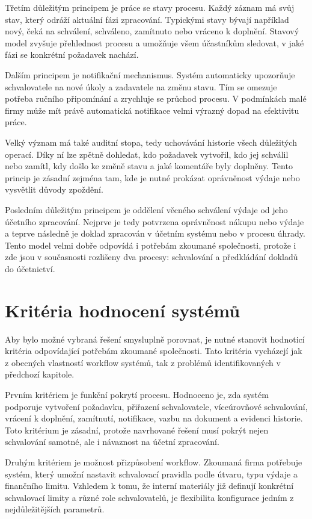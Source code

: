 Třetím důležitým principem je práce se stavy procesu. Každý záznam má svůj stav, který odráží aktuální fázi zpracování. Typickými stavy bývají například nový, čeká na schválení, schváleno, zamítnuto nebo vráceno k doplnění. Stavový model zvyšuje přehlednost procesu a umožňuje všem účastníkům sledovat, v jaké fázi se konkrétní požadavek nachází.

Dalším principem je notifikační mechanismus. Systém automaticky upozorňuje schvalovatele na nové úkoly a zadavatele na změnu stavu. Tím se omezuje potřeba ručního připomínání a zrychluje se průchod procesu. V podmínkách malé firmy může mít právě automatická notifikace velmi výrazný dopad na efektivitu práce.

Velký význam má také auditní stopa, tedy uchovávání historie všech důležitých operací. Díky ní lze zpětně dohledat, kdo požadavek vytvořil, kdo jej schválil nebo zamítl, kdy došlo ke změně stavu a jaké komentáře byly doplněny. Tento princip je zásadní zejména tam, kde je nutné prokázat oprávněnost výdaje nebo vysvětlit důvody zpoždění.

Posledním důležitým principem je oddělení věcného schválení výdaje od jeho účetního zpracování. Nejprve je tedy potvrzena oprávněnost nákupu nebo výdaje a teprve následně je doklad zpracován v účetním systému nebo v procesu úhrady. Tento model velmi dobře odpovídá i potřebám zkoumané společnosti, protože i zde jsou v současnosti rozlišeny dva procesy: schvalování a předkládání dokladů do účetnictví.


\section{Kritéria hodnocení systémů}

Aby bylo možné vybraná řešení smysluplně porovnat, je nutné stanovit hodnoticí kritéria odpovídající potřebám zkoumané společnosti. Tato kritéria vycházejí jak z obecných vlastností workflow systémů, tak z problémů identifikovaných v předchozí kapitole.

Prvním kritériem je funkční pokrytí procesu. Hodnoceno je, zda systém podporuje vytvoření požadavku, přiřazení schvalovatele, víceúrovňové schvalování, vrácení k doplnění, zamítnutí, notifikace, vazbu na dokument a evidenci historie. Toto kritérium je zásadní, protože navrhované řešení musí pokrýt nejen schvalování samotné, ale i návaznost na účetní zpracování.

Druhým kritériem je možnost přizpůsobení workflow. Zkoumaná firma potřebuje systém, který umožní nastavit schvalovací pravidla podle útvaru, typu výdaje a finančního limitu. Vzhledem k tomu, že interní materiály již definují konkrétní schvalovací limity a různé role schvalovatelů, je flexibilita konfigurace jedním z nejdůležitějších parametrů.

